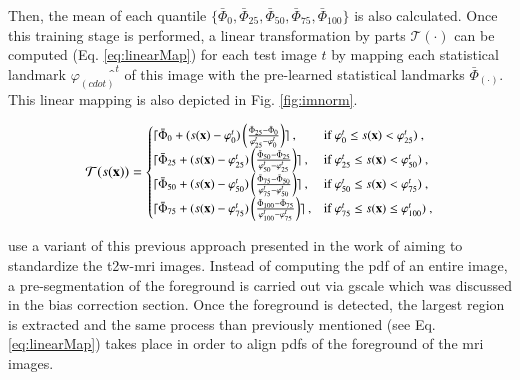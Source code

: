 \begin{enumerate}[leftmargin=*]
Then, the mean of each quantile $\{ \bar{\Phi}_{0}, \bar{\Phi}_{25}, \bar{\Phi}_{50}, \bar{\Phi}_{75}, \bar{\Phi}_{100} \}$ is also calculated.
Once this training stage is performed, a linear transformation by parts $\mathcal{T}(\cdot)$ can be computed (Eq. \eqref{eq:linearMap}) for each test image $t$ by mapping each statistical landmark $\varphi_{(cdot)}̂^{t}$ of this image with the pre-learned statistical landmarks $\bar{\Phi}_{(\cdot)}$. This linear mapping is also depicted in Fig. \ref{fig:imnorm}.

\begin{equation}
\small
\mathcal{T}(s(\mathbf{x})) =
  \begin{cases}
    \lceil \bar{\Phi}_{0}+( s(\mathbf{x}) - \varphi_{0}^{t} ) \left( \frac{\bar{\Phi}_{25} - \bar{\Phi}_{0}}{\varphi_{25}^{t} - \varphi_{0}^{t}} \right) \rceil \ , & \text{if $\varphi_{0}^{t} \leq s(\mathbf{x})<\varphi_{25}^{t})$} \ , \\
    \lceil \bar{\Phi}_{25}+( s(\mathbf{x}) - \varphi_{25}^{t} ) \left( \frac{\bar{\Phi}_{50} - \bar{\Phi}_{25}}{\varphi_{50}^{t} - \varphi_{25}^{t}} \right) \rceil \ , & \text{if $\varphi_{25}^{t} \leq s(\mathbf{x})<\varphi_{50}^{t})$} \ , \\
    \lceil \bar{\Phi}_{50}+( s(\mathbf{x}) - \varphi_{50}^{t} ) \left( \frac{\bar{\Phi}_{75} - \bar{\Phi}_{50}}{\varphi_{75}^{t} - \varphi_{50}^{t}} \right) \rceil \ , & \text{if $\varphi_{50}^{t} \leq s(\mathbf{x})<\varphi_{75}^{t})$} \ , \\
   \lceil \bar{\Phi}_{75}+( s(\mathbf{x}) - \varphi_{75}^{t} ) \left( \frac{\bar{\Phi}_{100} - \bar{\Phi}_{75}}{\varphi_{100}^{t} - \varphi_{75}^{t}} \right) \rceil \ , & \text{if $\varphi_{75}^{t} \leq s(\mathbf{x})\leq \varphi_{100}^{t})$} \ ,
  \end{cases}
  \label{eq:linearMap}
\end{equation}

\cite{Viswanath2009,Viswanath2011,Viswanath2012} use a variant of this previous approach presented in the work of \cite{Madabhushi2006a} aiming to standardize the \ac{t2w}-\ac{mri} images. Instead of computing the \ac{pdf} of an entire image, a pre-segmentation of the foreground is carried out via \ac{gscale} which was discussed in the bias correction section. Once the foreground is detected, the largest region is extracted and the same process than previously mentioned (see Eq. \eqref{eq:linearMap}) takes place in order to align \acp{pdf} of the foreground of the \ac{mri} images.


\end{enumerate}
